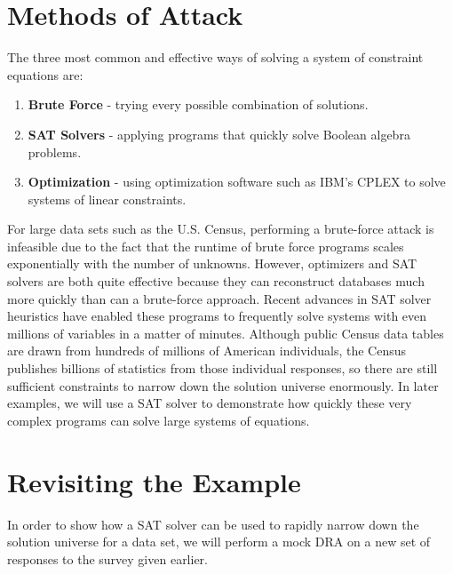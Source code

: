 \documentclass[jou,apacite]{apa6}
\begin{document}
\section{Methods of Attack}

The three most common and effective ways of solving a
system of constraint equations are:
\begin{enumerate}

\item \textbf{Brute Force} - trying every possible combination of solutions.\\

\item \textbf{SAT Solvers} - applying programs that quickly solve Boolean algebra problems.\\

\item \textbf{Optimization} -  using optimization software such as IBM's CPLEX to solve systems of linear constraints.

\end{enumerate}

For large data sets such as the U.S. Census, performing a brute-force attack is infeasible due to the fact that the runtime of brute force programs scales exponentially with the number of unknowns. However, optimizers and SAT solvers are both quite effective because they can reconstruct databases much more quickly than can a brute-force approach. Recent advances in SAT solver heuristics have enabled these programs to frequently solve systems with even millions of variables in a matter of minutes. Although public Census data tables are drawn from hundreds of millions of American individuals, the Census publishes billions of statistics from those individual responses, so there are still sufficient constraints to narrow down the solution universe enormously. In later examples, we will use a SAT solver to demonstrate how quickly these very complex programs can solve large systems of equations.

\section{Revisiting the Example}

In order to show how a SAT solver can be used to rapidly narrow down the solution universe for a data set, we will perform a mock DRA on a new set of responses to the survey given earlier.
\end{document}
